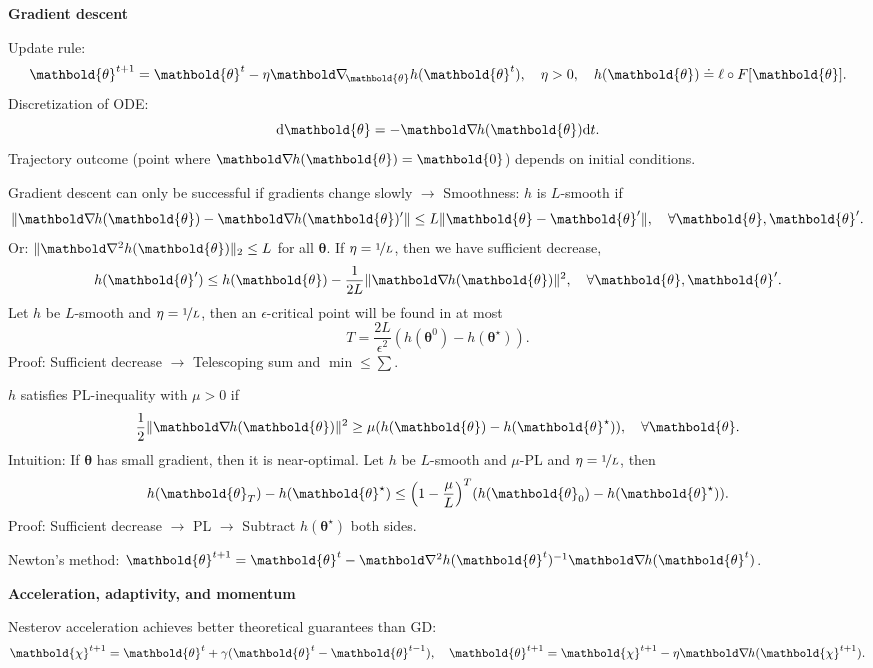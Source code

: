\documentclass[10pt]{article}
\newenvironment{topic}[1]
{\textbf{\sffamily \footnotesize \colorbox{black}{\rlap{\textbf{\textcolor{white}{#1}}}\hspace{\linewidth}\hspace{-2\fboxsep}}}}
{}
\newenvironment{subtopic}[1]
{\vspace{0.1cm} \begin{center}\textbf{\footnotesize \sffamily #1}\end{center}}
{}
\renewcommand{\vec}[1]{\ensuremath{\mathbold{#1}}}
\begin{document}
\begin{multicols*}{3}
\begin{topic}{Gradient-based learning}
        \begin{subtopic}{Gradient descent}
            Update rule: \[
                \vec{\theta}^{t+1} = \vec{\theta}^t - \eta \grad{h(\vec{\theta}^t)}{\vec{\theta}}, \quad \eta > 0, \quad h(\vec{\theta}) \doteq \ell \circ F[\vec{\theta}].
            \]
            Discretization of ODE: \[
                \mathrm{d}\vec{\theta} = -\grad{h(\vec{\theta})}{} \mathrm{d}t.
            \]
            Trajectory outcome (point where $\grad{h(\vec{\theta})}{} = \vec{0}$) depends on initial
            conditions.

            Gradient descent can only be successful if gradients change slowly $\to$ Smoothness: $h$ is
            $L$-smooth if \[
                \| \grad{h(\vec{\theta})}{} - \grad{h(\vec{\theta})'}{} \| \leq L \| \vec{\theta} - \vec{\theta}' \|, \quad \forall \vec{\theta},\vec{\theta}'.
            \]
            Or: $\| \hess{h(\vec{\theta})}{} \|_2 \leq L$ for all $\vec{\theta}$. If $\eta = \nicefrac{1}{L}$,
            then we have sufficient decrease, \[
                h(\vec{\theta}') \leq h(\vec{\theta}) - \frac{1}{2L} \| \grad{h(\vec{\theta})}{} \|^2, \quad \forall \vec{\theta},\vec{\theta}'.
            \]
            Let $h$ be $L$-smooth and $\eta=\nicefrac{1}{L}$, then an $\epsilon$-critical point will be found
            in at most \[
                T = \frac{2L}{\epsilon^2} (h(\vec{\theta}^0) - h(\vec{\theta}^\star)).
            \]
            Proof: Sufficient decrease $\to$ Telescoping sum and $\min \leq \sum$.

            $h$ satisfies PL-inequality with $\mu > 0$ if \[
                \frac{1}{2} \| \grad{h(\vec{\theta})}{} \|^2 \geq \mu (h(\vec{\theta}) - h(\vec{\theta}^\star)), \quad \forall \vec{\theta}.
            \]
            Intuition: If $\vec{\theta}$ has small gradient, then it is near-optimal. Let $h$ be $L$-smooth and
            $\mu$-PL and $\eta = \nicefrac{1}{L}$, then \[
                h(\vec{\theta}_T) - h(\vec{\theta}^\star) \leq \lft( 1 - \frac{\mu}{L} \rgt)^T (h(\vec{\theta}_0) - h(\vec{\theta}^\star)).
            \]
            Proof: Sufficient decrease $\to$ PL $\to$ Subtract $h(\vec{\theta}^\star)$ both sides.

            Newton's method: $\vec{\theta}^{t+1} = \vec{\theta}^t - \inv{\hess{h(\vec{\theta}^t)}{}} \grad{h(\vec{\theta}^t)}{}$.
            
        \end{subtopic}

        \begin{subtopic}{Acceleration, adaptivity, and momentum}
            Nesterov acceleration achieves better theoretical guarantees than GD: \[
                \vec{\chi}^{t+1} = \vec{\theta}^t + \gamma(\vec{\theta}^t - \vec{\theta}^{t-1}), \quad \vec{\theta}^{t+1} = \vec{\chi}^{t+1} - \eta \grad{h(\vec{\chi}^{t+1})}{}.
            \]


\end{subtopic}
\end{topic}
\end{multicols*}
\end{document}
